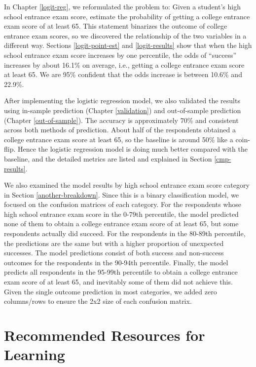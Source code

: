\documentclass[
]{article}
\begin{document}
In Chapter \ref{logit-reg}, we reformulated the problem to: Given a
student's high school entrance exam score, estimate the probability of
getting a college entrance exam score of at least 65. This statement
binarizes the outcome of college entrance exam scores, so we discovered
the relationship of the two variables in a different way. Sections
\ref{logit-point-est} and \ref{logit-results} show that when the high
school entrance exam score increases by one percentile, the odds of
``success'' increases by about 16.1\% on average, i.e., getting a
college entrance exam score at least 65. We are 95\% confident that the
odds increase is between 10.6\% and 22.9\%.

After implementing the logistic regression model, we also validated the
results using in-sample prediction (Chapter \ref{validation}) and
out-of-sample prediction (Chapter \ref{out-of-sample}). The accuracy is
approximately 70\% and consistent across both methods of prediction.
About half of the respondents obtained a college entrance exam score at
least 65, so the baseline is around 50\% like a coin-flip. Hence the
logistic regression model is doing much better compared with the
baseline, and the detailed metrics are listed and explained in Section
\ref{cmp-results}.

We also examined the model results by high school entrance exam score
category in Section \ref{another-breakdown}. Since this is a binary
classification model, we focused on the confusion matrices of each
category. For the respondents whose high school entrance exam score in
the 0-79th percentile, the model predicted none of them to obtain a
college entrance exam score of at least 65, but some respondents
actually did succeed. For the respondents in the 80-89th percentile, the
predictions are the same but with a higher proportion of unexpected
successes. The model predictions consist of both success and non-success
outcomes for the respondents in the 90-94th percentile. Finally, the
model predicts all respondents in the 95-99th percentile to obtain a
college entrance exam score of at least 65, and inevitably some of them
did not achieve this. Given the single outcome prediction in most
categories, we added zero columns/rows to ensure the 2x2 size of each
confusion matrix.

\hypertarget{resources}{%
\section{Recommended Resources for Learning}\label{resources}}
\end{document}
